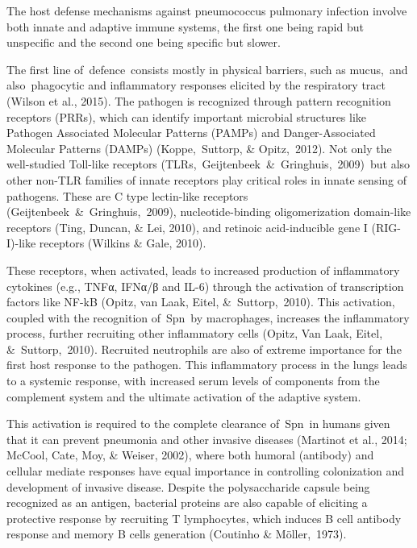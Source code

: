 \documentclass[
]{book}
\begin{document}
The host defense mechanisms against pneumococcus pulmonary infection involve both innate and adaptive immune systems, the first one being rapid but unspecific and the second one being specific but slower.

The first line of~defence~consists mostly in physical barriers, such as mucus,~and also~phagocytic and inflammatory responses elicited by the respiratory tract (Wilson et al., 2015). The pathogen is recognized through pattern recognition receptors (PRRs), which can identify important microbial structures like Pathogen Associated Molecular Patterns (PAMPs) and Danger-Associated Molecular Patterns (DAMPs) (Koppe,~Suttorp, \& Opitz,~2012)⁠. Not only the well-studied Toll-like receptors (TLRs,~Geijtenbeek~\&~Gringhuis,~2009)⁠~but also other non-TLR families of innate receptors play critical roles in innate sensing of pathogens. These are C type lectin-like receptors (Geijtenbeek~\&~Gringhuis,~2009)⁠, nucleotide-binding oligomerization domain-like receptors (Ting, Duncan, \& Lei, 2010)⁠, and retinoic acid-inducible gene I (RIG-I)-like receptors (Wilkins \& Gale, 2010)⁠.

These receptors, when activated, leads to increased production of inflammatory cytokines (e.g., TNFα, IFNα/β and IL-6) through the activation of transcription factors like NF-kB (Opitz, van Laak, Eitel, \&~Suttorp,~2010)⁠⁠. This activation, coupled with the recognition of~Spn~by macrophages, increases the inflammatory process, further recruiting other inflammatory cells (Opitz, Van Laak, Eitel, \&~Suttorp,~2010)⁠. Recruited neutrophils are also of extreme importance for the first host response to the pathogen. This inflammatory process in the lungs leads to a systemic response, with increased serum levels of components from the complement system and the ultimate activation of the adaptive system.

This activation is required to the complete clearance of~Spn~in humans given that it can prevent pneumonia and other invasive diseases (Martinot et al., 2014; McCool, Cate, Moy, \& Weiser, 2002)⁠, where both humoral (antibody) and cellular mediate responses have equal importance in controlling colonization and development of invasive disease. Despite the polysaccharide capsule being recognized as an antigen, bacterial proteins are also capable of eliciting a protective response by recruiting T lymphocytes, which induces B cell antibody response and memory B cells generation (Coutinho \& Möller,~1973)⁠.
\end{document}

